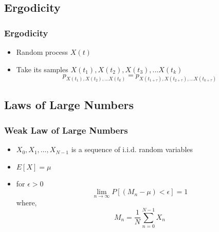 

\subsection{Ergodicity}
\begin{frame}
\frametitle{Ergodicity}
\logoEvolution\mypagenum
	\begin{itemize}
		\item Random process $X(t)$
		\item Take its samples $X(t_1), X(t_2), X(t_3), ...X(t_k)$
		\begin{equation*}
			p_{X(t_1), X(t_2), \ldots X(t_k)}= p_{X(t_{1+\tau}), X(t_{2+\tau}), \ldots X(t_{k+\tau})}
		\end{equation*}
	\end{itemize}
\end{frame}


\subsection{Laws of Large Numbers}
\begin{frame}
\frametitle{Weak Law of Large Numbers}
\logoEvolution\mypagenum
	\begin{itemize}
		\item $X_0, X_1, \ldots, X_{N-1}$ is a sequence of i.i.d. random variables
		\item  $E[X]=\mu$
		\item for $\epsilon > 0$
			\begin{equation*}
				\lim_{n\rightarrow \infty} P[(M_n-\mu)<\epsilon]=1
			\end{equation*}
			where,
			\begin{equation*}
				M_n=\frac{1}{N}\sum\limits_{n=0}^{N-1}X_n
			\end{equation*} 
	\end{itemize}
\end{frame}


